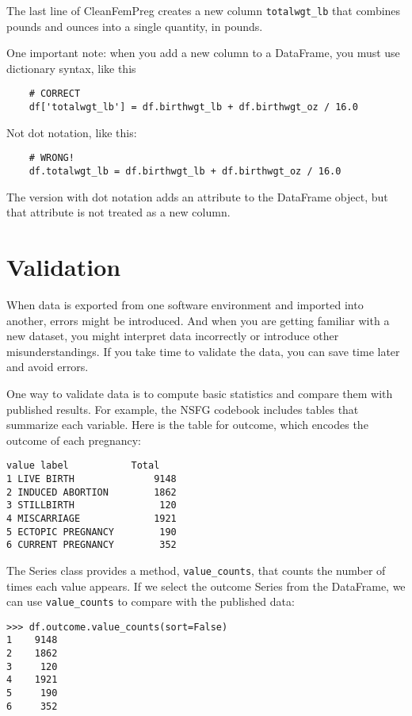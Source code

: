 \documentclass[]{book}
\begin{document}
The last line of CleanFemPreg creates a new column
\texttt{totalwgt\_lb} that combines pounds and ounces into a single quantity, in
pounds.

One important note: when you add a new
column to a DataFrame, you must use dictionary syntax, like this

\begin{verbatim}
    # CORRECT
    df['totalwgt_lb'] = df.birthwgt_lb + df.birthwgt_oz / 16.0 
\end{verbatim}

Not dot notation, like this:

\begin{verbatim}
    # WRONG!
    df.totalwgt_lb = df.birthwgt_lb + df.birthwgt_oz / 16.0 
\end{verbatim}

The version with dot notation adds an
attribute to the DataFrame object, but that attribute is not treated as
a new column.

\hypertarget{validation}{%
\section{Validation}\label{validation}}

When data is exported from one software
environment and imported into another, errors might be introduced. And
when you are getting familiar with a new dataset, you might interpret
data incorrectly or introduce other misunderstandings. If you take time
to validate the data, you can save time later and avoid errors.

One way to validate data is to compute
basic statistics and compare them with published results. For example,
the NSFG codebook includes tables that summarize each variable. Here is
the table for outcome, which
encodes the outcome of each pregnancy:

\begin{verbatim}
value label           Total
1 LIVE BIRTH              9148
2 INDUCED ABORTION        1862
3 STILLBIRTH               120
4 MISCARRIAGE             1921
5 ECTOPIC PREGNANCY        190
6 CURRENT PREGNANCY        352
\end{verbatim}

The Series class provides a method,
\texttt{value\_counts}, that counts the number of times each value appears. If
we select the outcome Series
from the DataFrame, we can use \texttt{value\_counts} to compare with the
published data:

\begin{verbatim}
>>> df.outcome.value_counts(sort=False)
1    9148
2    1862
3     120
4    1921
5     190
6     352
\end{verbatim}
\end{document}
